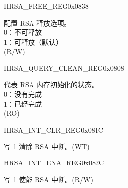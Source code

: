 \begin{register}{H}{RSA\_FREE\_REG}{0x0838}\label{regdesc:RSAFREEREG}
%
%
\regnewline%
\begin{regdesc}\begin{reglist}
\label{fielddesc:RSAFREE}\item [RSA\_FREE] 配置 RSA 释放选项。\\
0：不可释放\\
1：可释放（默认）\\
 (R/W)
\end{reglist}\end{regdesc}
\end{register}


\begin{register}{H}{RSA\_QUERY\_CLEAN\_REG}{0x0808}\label{regdesc:RSAQUERYCLEANREG}
%
%
\regnewline%
\begin{regdesc}\begin{reglist}
\label{fielddesc:RSAQUERYCLEAN}\item [RSA\_QUERY\_CLEAN] 代表 RSA 内存初始化的状态。\\
0：没有完成\\
1：已经完成\\
 (RO)
\end{reglist}\end{regdesc}
\end{register}


\begin{register}{H}{RSA\_INT\_CLR\_REG}{0x081C}\label{regdesc:RSAINTCLRREG}
%
%
\regnewline%
\begin{regdesc}\begin{reglist}
\label{fielddesc:RSACLEARINTERRUPT}\item [RSA\_CLEAR\_INTERRUPT] 写 1 清除 RSA 中断。(WT)
\end{reglist}\end{regdesc}
\end{register}


\begin{register}{H}{RSA\_INT\_ENA\_REG}{0x082C}\label{regdesc:RSAINTENAREG}
%
%
\regnewline%
\begin{regdesc}\begin{reglist}
\label{fielddesc:RSAINTENA}\item [RSA\_INT\_ENA] 写 1 使能 RSA 中断。(R/W)
\end{reglist}\end{regdesc}
\end{register}


